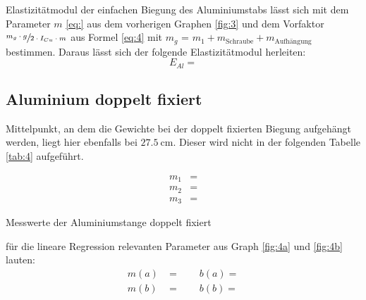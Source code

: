 \justifying Elastizitätmodul der einfachen Biegung des Aluminiumstabs lässt sich mit dem Parameter $m$ \eqref{eq:} aus dem
vorherigen Graphen \ref{fig:3} und dem Vorfaktor $\sfrac{m_g \cdot g}{2 \cdot I_{Cu} \cdot m}$ aus Formel \eqref{eq:4} mit $m_g$ = $m_1 + 
m_{\text{Schraube}} + m_{\text{Aufhängung}}$ bestimmen. Daraus lässt sich der folgende Elastizitätmodul herleiten:
\begin{equation}
E_{Al} =  \label{eq:}
\end{equation}


\subsection{Aluminium doppelt fixiert}\label{4.4}

\justifying Mittelpunkt, an dem die Gewichte bei der doppelt fixierten Biegung aufgehängt werden, liegt hier ebenfalls bei 
$\SI{27.5}{\centi\meter}$. Dieser wird nicht in der folgenden Tabelle \ref{tab:4} aufgeführt.

\begin{subequations}\label{eq:}
\begin{align}
    m_1 &= \text{} \label{eq:a}\\
    m_2 &= \text{} \label{eq:b}\\
    m_3 &= \text{} \label{eq:c}
\end{align}
\end{subequations}

\begin{table}[H]
    \centering
    
    \caption{Messwerte der Aluminiumstange doppelt fixiert}
    \label{tab:6}
\end{table}

\justifying für die lineare Regression relevanten Parameter aus Graph \ref{fig:4a} und \ref{fig:4b} lauten:
\begin{subequations}\label{eq:}
\begin{align}
    m(a) &= \text{} \qquad
    b(a) = \text{}\label{eq:a}\\
    m(b) &= \text{} \qquad
    b(b) = \text{}\label{eq:b}
\end{align}
\end{subequations}

